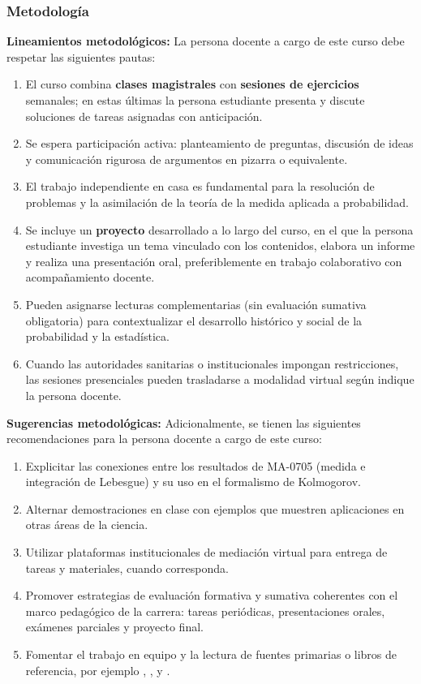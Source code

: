 \begin{refsection}
\begin{enumerate}
\end{enumerate}

\subsubsection*{Metodología}

\noindent \textbf{Lineamientos metodológicos:} La persona docente a cargo de este curso debe respetar las siguientes pautas:

\begin{enumerate}
    \item El curso combina \textbf{clases magistrales} con \textbf{sesiones de ejercicios} semanales; en estas últimas la persona estudiante presenta y discute soluciones de tareas asignadas con anticipación.
    \item Se espera participación activa: planteamiento de preguntas, discusión de ideas y comunicación rigurosa de argumentos en pizarra o equivalente.
    \item El trabajo independiente en casa es fundamental para la resolución de problemas y la asimilación de la teoría de la medida aplicada a probabilidad.
    \item Se incluye un \textbf{proyecto} desarrollado a lo largo del curso, en el que la persona estudiante investiga un tema vinculado con los contenidos, elabora un informe y realiza una presentación oral, preferiblemente en trabajo colaborativo con acompañamiento docente.
    \item Pueden asignarse lecturas complementarias (sin evaluación sumativa obligatoria) para contextualizar el desarrollo histórico y social de la probabilidad y la estadística.
    \item Cuando las autoridades sanitarias o institucionales impongan restricciones, las sesiones presenciales pueden trasladarse a modalidad virtual según indique la persona docente.
\end{enumerate}

\textbf{Sugerencias metodológicas:} Adicionalmente, se tienen las siguientes recomendaciones para la persona docente a cargo de este curso:

\begin{enumerate}
    \item Explicitar las conexiones entre los resultados de MA-0705 (medida e integración de Lebesgue) y su uso en el formalismo de Kolmogorov.
    \item Alternar demostraciones en clase con ejemplos que muestren aplicaciones en otras áreas de la ciencia.
    \item Utilizar plataformas institucionales de mediación virtual para entrega de tareas y materiales, cuando corresponda.
    \item Promover estrategias de evaluación formativa y sumativa coherentes con el marco pedagógico de la carrera: tareas periódicas, presentaciones orales, exámenes parciales y proyecto final.
    \item Fomentar el trabajo en equipo y la lectura de fuentes primarias o libros de referencia, por ejemplo \cite{AshDD99}, \cite{Bil95}, \cite{Dur19} y \cite{Gri20}.
\end{enumerate}


\end{refsection}
